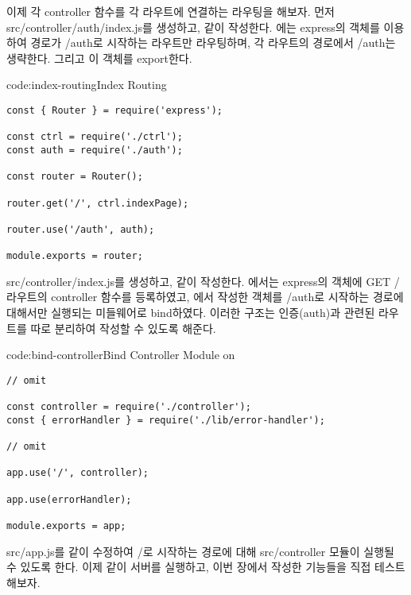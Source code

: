 이제 각 controller 함수를 각 라우트에 연결하는 라우팅을 해보자. 먼저 src/controller/auth/index.js를 생성하고, \과 같이 작성한다. 에는 express의  객체를 이용하여 경로가 /auth로 시작하는 라우트만 라우팅하며, 각 라우트의 경로에서 /auth는 생략한다. 그리고 이  객체를 export한다.

\begin{codeenv}{code:index-routing}{Index Routing}\begin{verbatim}
const { Router } = require('express');

const ctrl = require('./ctrl');
const auth = require('./auth');

const router = Router();

router.get('/', ctrl.indexPage);

router.use('/auth', auth);

module.exports = router;
\end{verbatim}
\end{codeenv}

src/controller/index.js를 생성하고, \과 같이 작성한다. 에서는 express의  객체에 GET / 라우트의 controller 함수를 등록하였고, 에서 작성한  객체를 /auth로 시작하는 경로에 대해서만 실행되는 미들웨어로 bind하였다. 이러한 구조는 인증(auth)과 관련된 라우트를 따로 분리하여 작성할 수 있도록 해준다.
\newpage

\begin{codeenv}{code:bind-controller}{Bind Controller Module on }\begin{verbatim}
// omit

const controller = require('./controller');
const { errorHandler } = require('./lib/error-handler');

// omit

app.use('/', controller);

app.use(errorHandler);

module.exports = app;
\end{verbatim}
\end{codeenv}

src/app.js를 \와 같이 수정하여 /로 시작하는 경로에 대해 src/controller 모듈이 실행될 수 있도록 한다. 이제 \와 같이 서버를 실행하고, 이번 장에서 작성한 기능들을 직접 테스트 해보자.
